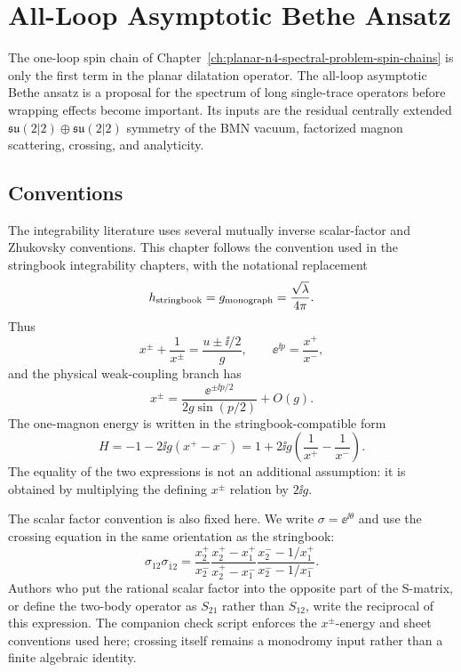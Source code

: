 \chapter{All-Loop Asymptotic Bethe Ansatz}
\label{ch:planar-n4-asymptotic-bethe-ansatz}

\ConventionsLorentzian

The one-loop spin chain of
Chapter~\ref{ch:planar-n4-spectral-problem-spin-chains} is only the first
term in the planar dilatation operator.  The all-loop asymptotic Bethe ansatz
is a proposal for the spectrum of long single-trace operators before wrapping
effects become important.  Its inputs are the residual centrally extended
\(\mathfrak{su}(2|2)\oplus\mathfrak{su}(2|2)\) symmetry of the BMN vacuum,
factorized magnon scattering, crossing, and analyticity.

\section{Conventions}

The integrability literature uses several mutually inverse scalar-factor and
Zhukovsky conventions.  This chapter follows the convention used in the
stringbook integrability chapters, with the notational replacement
\[
  h_{\rm stringbook}=g_{\rm monograph}=\frac{\sqrt\lambda}{4\pi}.
\]
Thus
\[
  x^\pm+\frac1{x^\pm}
  =
  \frac{u\pm\ii/2}{g},
  \qquad
  \ee^{\ii p}=\frac{x^+}{x^-},
\]
and the physical weak-coupling branch has
\[
  x^\pm
  =
  \frac{\ee^{\pm\ii p/2}}{2g\sin(p/2)}+O(g).
\]
The one-magnon energy is written in the stringbook-compatible form
\[
  H
  =
  -1-2\ii g(x^+-x^-)
  =
  1+2\ii g\left(\frac1{x^+}-\frac1{x^-}\right).
\]
The equality of the two expressions is not an additional assumption: it is
obtained by multiplying the defining \(x^\pm\) relation by \(2\ii g\).

The scalar factor convention is also fixed here.  We write
\(\sigma=\ee^{\ii\theta}\) and use the crossing equation in the same
orientation as the stringbook:
\[
  \sigma_{12}\sigma_{\bar1 2}
  =
  \frac{x_2^+}{x_2^-}
  \frac{x_2^+ -x_1^+}{x_2^+ -x_1^-}
  \frac{x_2^- -1/x_1^+}{x_2^- -1/x_1^-}.
\]
Authors who put the rational scalar factor into the opposite part of the
S-matrix, or define the two-body operator as \(S_{21}\) rather than \(S_{12}\),
write the reciprocal of this expression.  The companion check script enforces
the \(x^\pm\)-energy and sheet conventions used here; crossing itself remains
a monodromy input rather than a finite algebraic identity.

